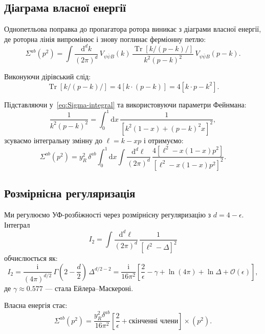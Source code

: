 \documentclass[11pt,a4paper]{article}
\numberwithin{equation}{section}
\theoremstyle{plain}
\theoremstyle{definition}
\theoremstyle{remark}
\DeclareMathOperator{\Tr}{Tr}
\newcommand{\dd}{\mathrm{d}}
\newcommand{\ii}{\mathrm{i}}
\begin{document}
\subsection{Діаграма власної енергії}

Однопетльова поправка до пропагатора ротора виникає з діаграми власної енергії, де роторна лінія випромінює і знову поглинає ферміонну петлю:
\begin{equation}
\Sigma^{ab}(p^2) = \int \frac{\dd^d k}{(2\pi)^d}\,V_{\psi\bar\psi B}(k)\,\frac{\Tr[k\!\!\!/(p-k)\!\!\!/]}{k^2(p-k)^2}\,V_{\psi\bar\psi B}(p-k).
\label{eq:Sigma-integral}
\end{equation}

Виконуючи дірівський слід:
\begin{equation}
\Tr[k\!\!\!/(p-k)\!\!\!/] = 4[k\cdot(p-k)] = 4[k\cdot p - k^2].
\label{eq:trace-dirac}
\end{equation}

Підставляючи у~\eqref{eq:Sigma-integral} та використовуючи параметри Фейнмана:
\begin{equation}
\frac{1}{k^2(p-k)^2} = \int_0^1 \dd x\,\frac{1}{[k^2(1-x)+(p-k)^2 x]^2},
\label{eq:feynman-param}
\end{equation}
зсуваємо інтегральну змінну до $\ell = k - xp$ і отримуємо:
\begin{equation}
\Sigma^{ab}(p^2) = y_R^2\,\delta^{ab}\int_0^1 \dd x\int \frac{\dd^d \ell}{(2\pi)^d}\,\frac{4[\ell^2 - x(1-x)p^2]}{[\ell^2 - x(1-x)p^2]^2}.
\label{eq:Sigma-feynman}
\end{equation}

\subsection{Розмірнісна регуляризація}

Ми регулюємо УФ-розбіжності через розмірнісну регуляризацію з $d=4-\epsilon$. Інтеграл
\begin{equation}
I_2 = \int \frac{\dd^d \ell}{(2\pi)^d}\,\frac{1}{[\ell^2-\Delta]^2}
\label{eq:I2}
\end{equation}
обчислюється як:
\begin{equation}
I_2 = \frac{\ii}{(4\pi)^{d/2}}\,\Gamma\left(2-\frac{d}{2}\right)\,\Delta^{d/2-2} = \frac{\ii}{16\pi^2}\left[\frac{2}{\epsilon} - \gamma + \ln(4\pi) + \ln\Delta + \mathcal{O}(\epsilon)\right],
\label{eq:I2-result}
\end{equation}
де $\gamma\approx 0.577$ — стала Ейлера–Маскероні.

Власна енергія стає:
\begin{equation}
\Sigma^{ab}(p^2) = \frac{y_R^2\delta^{ab}}{16\pi^2}\left[\frac{2}{\epsilon} + \text{скінченні члени}\right]\times (p^2).
\label{eq:Sigma-div}
\end{equation}
\end{document}

